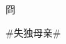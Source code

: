 \documentclass{article}
\newcommand{\zh}[1]{\begin{CJK}{UTF8}{gkai}#1\end{CJK}}
\newcommand{\zht}[1]{\begin{CJK}{UTF8}{bkai}#1\end{CJK}}
\begin{document}
% 
\zht{冏}
\zh{\#失独母亲\#}
\end{document}
